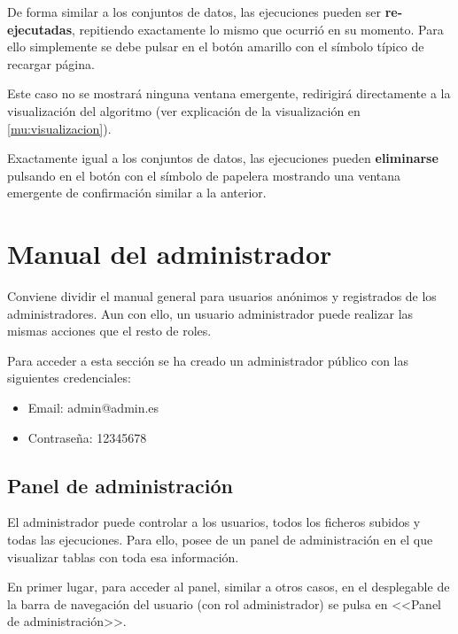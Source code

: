 
De forma similar a los conjuntos de datos, las ejecuciones pueden ser
\textbf{re-ejecutadas}, repitiendo exactamente lo mismo que ocurrió en su
momento. Para ello simplemente se debe pulsar en el botón amarillo con el
símbolo típico de recargar página.

Este caso no se mostrará ninguna ventana emergente, redirigirá directamente a la
visualización del algoritmo (ver explicación de la visualización en
\ref{mu:visualizacion}).

\label{mu:eliminarrun}
Exactamente igual a los conjuntos de datos, las ejecuciones pueden
\textbf{eliminarse} pulsando en el botón con el símbolo de papelera mostrando
una ventana emergente de confirmación similar a la anterior.



\section{Manual del administrador}

Conviene dividir el manual general para usuarios anónimos y registrados de los
administradores. Aun con ello, un usuario administrador puede realizar las
mismas acciones que el resto de roles.

Para acceder a esta sección se ha creado un administrador público con las
siguientes credenciales:
\begin{itemize}
    \item Email: admin@admin.es
    \item Contraseña: 12345678
\end{itemize}

\subsection{Panel de administración}

El administrador puede controlar a los usuarios, todos los ficheros subidos y
todas las ejecuciones. Para ello, posee de un panel de administración en el que
visualizar tablas con toda esa información.

En primer lugar, para acceder al panel, similar a otros casos, en el desplegable
de la barra de navegación del usuario (con rol administrador) se pulsa en
<<Panel de administración>>.


